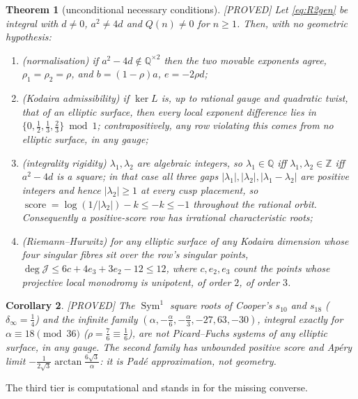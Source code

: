 \documentclass[11pt,reqno]{amsart}
\theoremstyle{plain}
\theoremstyle{definition}
\theoremstyle{remark}
\theoremstyle{plain}
\newtheorem{namedthm}{Theorem}
\newtheorem{namedcor}[namedthm]{Corollary}
\newcommand{\Z}{\mathbb{Z}}
\newcommand{\Q}{\mathbb{Q}}
\DeclareMathOperator{\Sym}{Sym}
\newcommand{\Proved}{\textup{\textsf{[PROVED]}}}
\begin{document}
\begin{namedthm}[unconditional necessary conditions]\label{thmB}
\Proved{} Let \eqref{eq:R2gen} be integral with $d\ne0$, $a^2\ne4d$ and
$Q(n)\ne0$ for $n\ge1$. Then, with no geometric hypothesis:
\begin{enumerate}[label=\textup{(\roman*)},leftmargin=2.6em]
\item \emph{(normalisation)} if $a^2-4d\notin\Q^{\times2}$ then the two movable
exponents agree, $\rho_1=\rho_2=\rho$, and $b=(1-\rho)a$, $e=-2\rho d$;
\item \emph{(Kodaira admissibility)} if $\ker L$ is, up to rational gauge and
quadratic twist, that of an elliptic surface, then every local exponent
difference lies in $\{0,\tfrac12,\tfrac13,\tfrac23\}\bmod1$; contrapositively,
any row violating this comes from no elliptic surface, in any gauge;
\item \emph{(integrality rigidity)} $\lambda_1,\lambda_2$ are algebraic integers,
so $\lambda_1\in\Q$ iff $\lambda_1,\lambda_2\in\Z$ iff $a^2-4d$ is a square; in
that case all three gaps $|\lambda_1|,|\lambda_2|,|\lambda_1-\lambda_2|$ are
positive integers and hence $|\lambda_2|\ge1$ at \emph{every} cusp placement, so
$\operatorname{score}=\log(1/|\lambda_2|)-k\le-k\le-1$ throughout the rational
orbit. Consequently a positive-score row has irrational characteristic roots;
\item \emph{(Riemann--Hurwitz)} for any elliptic surface of any Kodaira dimension
whose four singular fibres sit over the row's singular points,
$\deg\mathcal J\le6c+4e_3+3e_2-12\le12$, where $c,e_2,e_3$ count the points whose
projective local monodromy is unipotent, of order $2$, of order $3$.
\end{enumerate}
\end{namedthm}

\begin{namedcor}\label{corB}
\Proved{} The $\Sym^1$ square roots of Cooper's $s_{10}$ and $s_{18}$
\textup{(}$\delta_\infty=\tfrac14$\textup{)} and the infinite family
$(\alpha,-\tfrac\alpha6,-\tfrac\alpha3,-27,63,-30)$, integral exactly for
$\alpha\equiv18\pmod{36}$ \textup{(}$\rho=\tfrac76\equiv\tfrac16$\textup{)}, are
not Picard--Fuchs systems of any elliptic surface, in any gauge. The second
family has unbounded positive score and Ap\'ery limit
$-\tfrac1{2\sqrt3}\arctan\tfrac{6\sqrt3}\alpha$: it is Pad\'e approximation, not
geometry.
\end{namedcor}

The third tier is computational and stands in for the missing converse.
\end{document}
